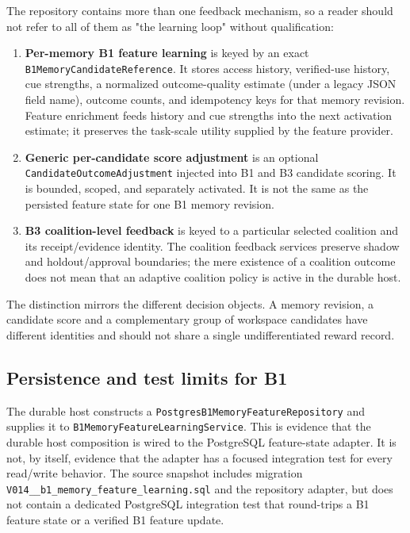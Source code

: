 The repository contains more than one feedback mechanism, so a reader should not refer to all of them as "the learning loop" without qualification:

\begin{enumerate}
  \item \textbf{Per-memory B1 feature learning} is keyed by an exact \texttt{B1\allowbreak{}Memory\allowbreak{}Candidate\allowbreak{}Reference}. It stores access history, verified-use history, cue strengths, a normalized outcome-quality estimate (under a legacy JSON field name), outcome counts, and idempotency keys for that memory revision. Feature enrichment feeds history and cue strengths into the next activation estimate; it preserves the task-scale utility supplied by the feature provider.
  \item \textbf{Generic per-candidate score adjustment} is an optional \texttt{Candidate\allowbreak{}Outcome\allowbreak{}Adjustment} injected into B1 and B3 candidate scoring. It is bounded, scoped, and separately activated. It is not the same as the persisted feature state for one B1 memory revision.
  \item \textbf{B3 coalition-level feedback} is keyed to a particular selected coalition and its receipt/evidence identity. The coalition feedback services preserve shadow and holdout/approval boundaries; the mere existence of a coalition outcome does not mean that an adaptive coalition policy is active in the durable host.
\end{enumerate}

The distinction mirrors the different decision objects. A memory revision, a candidate score and a complementary group of workspace candidates have different identities and should not share a single undifferentiated reward record.

\subsection{Persistence and test limits for B1}
\label{subsec:ch21-b1-persistence}

The durable host constructs a \texttt{Postgres\allowbreak{}B1\allowbreak{}Memory\allowbreak{}Feature\allowbreak{}Repository} and supplies it to \texttt{B1\allowbreak{}Memory\allowbreak{}Feature\allowbreak{}Learning\allowbreak{}Service}. This is evidence that the durable host composition is wired to the PostgreSQL feature-state adapter. It is not, by itself, evidence that the adapter has a focused integration test for every read/write behavior. The source snapshot includes migration \texttt{V014\_\_\allowbreak{}b1\_\allowbreak{}memory\_\allowbreak{}feature\_\allowbreak{}learning.sql} and the repository adapter, but does not contain a dedicated PostgreSQL integration test that round-trips a B1 feature state or a verified B1 feature update.

